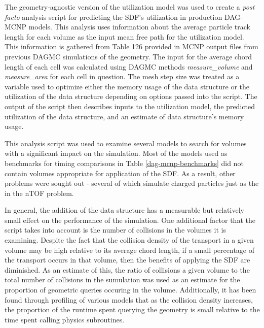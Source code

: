 The geometry-agnostic version of the utilization model was used to create a
\textit{post facto} analysis script for predicting the SDF's utilization in
production DAG-MCNP models. This analysis uses information about the average
particle track length for each volume as the input mean free path for the
utilization model. This information is gathered from Table 126 provided in MCNP
output files from previous DAGMC simulations of the geometry. The input for the
average chord length of each cell was calculated using DAGMC methods
\textit{measure\_volume} and \textit{measure\_area} for each cell in
question. The mesh step size was treated as a variable used to optimize either
the memory usage of the data structure or the utilization of the data structure
depending on options passed into the script. The output of the script then
describes inputs to the utilization model, the predicted utilization of the data
structure, and an estimate of data structure's memory usage.

This analysis script was used to examine several models to search for volumes
with a significant impact on the simulation. Most of the models used as
benchmarks for timing comparisons in Table \ref{dag-mcnp-benchmarks} did not
contain volumes appropriate for application of the SDF. As a result, other
problems were sought out - several of which simulate charged particles just as
the in the nTOF problem.

In general, the addition of the data structure has a measurable but relatively
small effect on the performance of the simulation. One additional factor that
the script takes into account is the number of collisions in the volumes it is
examining. Despite the fact that the collision density of the transport in a
given volume may be high relative to its average chord length, if a small
percentage of the transport occurs in that volume, then the benefits of applying
the SDF are diminished. As an estimate of this, the ratio of collisions a given
volume to the total number of collisions in the sumulation was used as an
estimate for the proportion of geometric queries occuring in the volume.
Additionally, it has been found through profiling of various models that as the
collision density increases, the proportion of the runtime spent querying the
geometry is small relative to the time spent calling physics subroutines.


